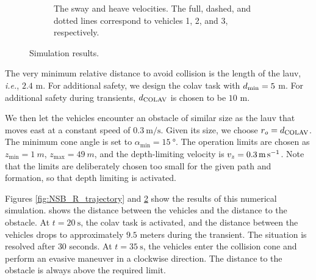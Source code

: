 \begin{figure}[p]
\begin{subfigure}[t]{0.475\textwidth}
        \vspace{-2.5mm}
    \end{subfigure}
    \hspace{1em}
    \begin{subfigure}[t]{0.475\textwidth}
        \centering
        
        \vspace{-8mm}
        \caption{The sway and heave velocities. The full, dashed, and dotted lines correspond to vehicles 1, 2, and 3, respectively.}
        \label{fig:NSB_R_sway_heave}
        \vspace{-2.5mm}
    \end{subfigure}
    \caption{Simulation results.}
    \label{fig:NSB_R_results}    
\end{figure}

The very minimum relative distance to avoid collision is the length of the \gls{lauv}, \emph{i.e.}, $2.4$ m.
For additional safety, we design the \gls{colav} task with $d_{\rm min} = 5$ m.
For additional safety during transients, $d_{\rm COLAV}$ is chosen to be $10$ m.



We then let the vehicles encounter an obstacle of similar size as the \gls{lauv} that moves east at a constant speed of $\SI{0.3}{\meter\per\second}$.
Given its size, we choose $r_o = d_{\rm COLAV}$.
The minimum cone angle is set to $\alpha_{\min} = \SI{15}{\degree}$.
The operation limits are chosen as $z_{\min} = \SI{1}{m}$, $z_{\max} = \SI{49}{m}$, and the depth-limiting velocity is $v_z = \SI{0.3}{\meter\per\second}$.
Note that the limits are deliberately chosen too small for the given path and formation, so that depth limiting is activated.



Figures \ref{fig:NSB_R_trajectory} and \ref{fig:NSB_R_results} show the results of this numerical simulation.
 shows the distance between the vehicles and the distance to the obstacle.
At $t = \SI{20}{\second}$, the \gls{colav} task is activated, and the distance between the vehicles drops to approximately $9.5$ meters during the transient.
The situation is resolved after $30$ seconds.
At $t = \SI{35}{\second}$, the vehicles enter the collision cone and perform an evasive maneuver in a clockwise direction.
The distance to the obstacle is always above the required limit.



